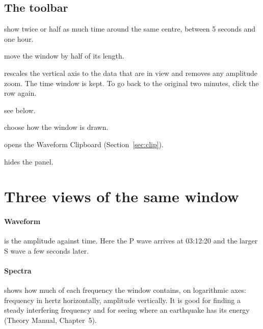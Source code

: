 \subsection{The toolbar}
\begin{description}[leftmargin=3.2cm,style=nextline]
\item[Zoom out, zoom in \hspace{0.2em}(4, 5)] show twice or half as much time around the same centre, between 5 seconds and one hour.
\item[Earlier, later \hspace{0.2em}(6, 7)] move the window by half of its length.
\item[Fit \hspace{0.2em}(2)] rescales the vertical axis to the data that are in view and removes any amplitude zoom. The time window
  is kept. To go back to the original two minutes, click the row again.
\item[Box zoom \hspace{0.2em}(3)] see below.
\item[Waveform / Spectra / Spectrogram \hspace{0.2em}(8)] choose how the window is drawn.
\item[Clipboard \hspace{0.2em}(9)] opens the Waveform Clipboard (Section~\ref{sec:clip}).
\item[Close \hspace{0.2em}(10)] hides the panel.
\end{description}

\section{Three views of the same window}
\paragraph{Waveform} is the amplitude against time. Here the P wave arrives at 03:12:20 and the larger S wave a few seconds later.

\paragraph{Spectra} shows how much of each frequency the window contains, on logarithmic axes: frequency in hertz horizontally,
amplitude vertically. It is good for finding a steady interfering frequency and for seeing where an earthquake has its energy
(Theory Manual, Chapter~5).

